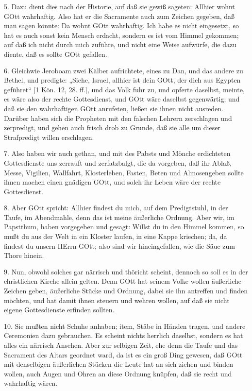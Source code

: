 5. Dazu dient dies nach der Historie, auf daß sie gewiß sageten: Allhier wohnt GOtt wahrhaftig. Also hat er die Sacramente auch zum Zeichen gegeben, daß man sagen könnte: Da wohnt GOtt wahrhaftig. Ich habe es nicht eingesetzt, so hat es auch sonst kein Mensch erdacht, sondern es ist vom Himmel gekommen; auf daß ich nicht durch mich zuführe, und nicht eine Weise aufwürfe, die dazu diente, daß es sollte GOtt gefallen.

6. Gleichwie Jeroboam zwei Kälber aufrichtete, eines zu Dan, und das andere zu Bethel, und predigte: „Siehe, Israel, allhier ist dein GOtt, der dich aus Egypten geführet“ [1 Kön. 12, 28. ff.], und das Volk fuhr zu, und opferte daselbst, meinte, es wäre also der rechte Gottesdienst, und GOtt wäre daselbst gegenwärtig; und daß sie den wahrhaftigen GOtt anrufeten, ließen sie ihnen nicht ausreden. Darüber haben sich die Propheten mit den falschen Lehrern zerschlagen und zerpredigt, und gehen auch frisch drob zu Grunde, daß sie alle um dieser Strafpredigt willen erschlagen.

7. Also haben wir auch gethan, und mit des Pabsts und Mönche erdichteten Gottesdienste uns zerrauft und zerfatzbalgt, die da vorgeben, daß ihr Ablaß, Messe, Vigilien, Wallfahrt, Klosterleben, Fasten, Beten und Almosengeben sollte ihnen machen einen gnädigen GOtt, und solch ihr Leben wäre der rechte Gottesdienst.

8. Aber GOtt spricht: Allhier findest du mich, auf dem Predigtstuhl, in der Taufe, im Abendmahle, denn das ist meine äußerliche Ordnung. Aber wir, im Papstthum, haben vorgegeben und gesagt: Willst du in den Himmel kommen, so mußt du aus der Welt in ein Kloster laufen, in eine Kappe kriechen; da, da findest du unsern HErrn GOtt; also sind wir hineingefallen, wie die Säue zum Thore hinein.

9. Nun, obwohl solches gar närrisch und thöricht scheint, dennoch so soll es in der christlichen Kirche allein gelten. Denn GOtt hat seinem Volke wollen äußerliche Zeichen geben, äußerliche Stücke und Ordnung, dabei sie ihn antreffen und finden möchten, und hat damit ihnen steuern und wehren wollen, auf daß sie nicht eigene Gottesdienste erfinden sollten.

10. Sie mußten nicht Schuhe anhaben; item, Stäbe in Händen tragen, und andere Ceremonien dazu gebrauchen. Es scheint nichts herrlich daselbst, sondern es hat alles ein närrisch Ansehen. Aber zur selbigen Zeit, ehe denn die Taufe und das Sacrament des Altars geordnet ward, da ist es ein groß Ding gewesen, daß GOtt mit denselbigen äußerlichen Stücken die Leute hat an sich ziehen und binden wollen, auch Augen und Ohren an diese Ordnung knüpfen, daß sie recht und wahrhaftig wären.

